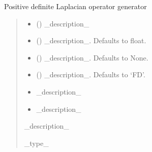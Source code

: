 \documentclass[letterpaper,10pt,english]{sphinxmanual}
\begin{document}
\begin{fulllineitems}
\label{\detokenize{fcdft.solvent:fcdft.solvent.calculus_helper.poisson}}
\pysigstartsignatures
\pysiglinewithargsret
{}
{\sphinxparamcomma {}\sphinxparamcomma {}\sphinxparamcomma {}}
{}
\pysigstopsignatures
\sphinxAtStartPar
Positive definite Laplacian operator generator
\begin{quote}\begin{description}
\begin{itemize}
\item {} 
\sphinxAtStartPar
{} () \textendash{} \_description\_

\item {} 
\sphinxAtStartPar
{} (\sphinxstyleliteralemphasis{\sphinxupquote{, }}) \textendash{} \_description\_. Defaults to float.

\item {} 
\sphinxAtStartPar
{} (\sphinxstyleliteralemphasis{\sphinxupquote{, }}) \textendash{} \_description\_. Defaults to None.

\item {} 
\sphinxAtStartPar
{} (\sphinxstyleliteralemphasis{\sphinxupquote{, }}) \textendash{} \_description\_. Defaults to ‘FD’.

\end{itemize}

\begin{itemize}
\item {} 
\sphinxAtStartPar
{} \textendash{} \_description\_

\item {} 
\sphinxAtStartPar
{} \textendash{} \_description\_

\end{itemize}

\sphinxAtStartPar
\_description\_

\sphinxAtStartPar
\_type\_

\end{description}\end{quote}

\end{fulllineitems}
\end{document}
